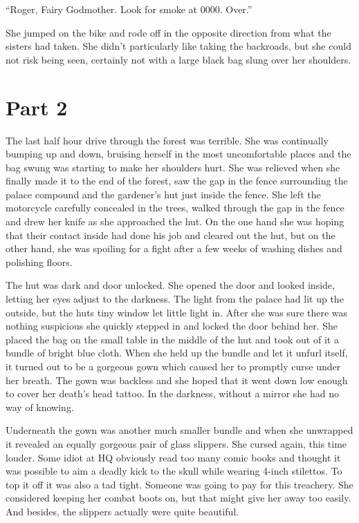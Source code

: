 \documentclass[11pt,letterpaper]{article}
\begin{document}
``Roger, Fairy Godmother. Look for smoke at 0000. Over.''

She jumped on the bike and rode off in the opposite direction from what the sisters had taken. She didn't particularly like taking the backroads, but she could not risk being seen, certainly not with a large black bag slung over her shoulders.

\section*{Part 2}

The last half hour drive through the forest was terrible. She was continually bumping up and down, bruising herself in the most uncomfortable places and the bag swung was starting to make her shoulders hurt. She was relieved when she finally made it to the end of the forest, saw the gap in the fence surrounding the palace compound and the gardener's hut just inside the fence. She left the motorcycle carefully concealed in the trees, walked through the gap in the fence and drew her knife as she approached the hut. On the one hand she was hoping that their contact inside had done his job and cleared out the hut, but on the other hand, she was spoiling for a fight after a few weeks of washing dishes and polishing floors.

The hut was dark and door unlocked. She opened the door and looked inside, letting her eyes adjust to the darkness. The light from the palace had lit up the outside, but the huts tiny window let little light in. After she was sure there was nothing suspicious she quickly stepped in and locked the door behind her. She placed the bag on the small table in the middle of the hut and took out of it a bundle of bright blue cloth. When she held up the bundle and let it unfurl itself, it turned out to be a gorgeous gown which caused her to promptly curse under her breath. The gown was backless and she hoped that it went down low enough to cover her death's head tattoo. In the darkness, without a mirror she had no way of knowing.

Underneath the gown was another much smaller bundle and when she unwrapped it revealed an equally gorgeous pair of glass slippers. She cursed again, this time louder. Some idiot at HQ obviously read too many comic books and thought it was possible to aim a deadly kick to the skull while wearing 4-inch stilettos. To top it off it was also a tad tight. Someone was going to pay for this treachery. She considered keeping her combat boots on, but that might give her away too easily. And besides, the slippers actually were quite beautiful.
\end{document}
